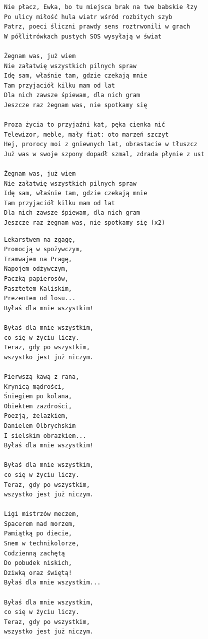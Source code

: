 \documentclass[12pt]{article}
\begin{document}
\begin{verbatim}
Nie płacz, Ewka, bo tu miejsca brak na twe babskie łzy
Po ulicy miłość hula wiatr wśród rozbitych szyb
Patrz, poeci śliczni prawdy sens roztrwonili w grach
W półlitrówkach pustych SOS wysyłają w świat

Żegnam was, już wiem
Nie załatwię wszystkich pilnych spraw
Idę sam, właśnie tam, gdzie czekają mnie
Tam przyjaciół kilku mam od lat
Dla nich zawsze śpiewam, dla nich gram
Jeszcze raz żegnam was, nie spotkamy się

Proza życia to przyjaźni kat, pęka cienka nić
Telewizor, meble, mały fiat: oto marzeń szczyt
Hej, prorocy moi z gniewnych lat, obrastacie w tłuszcz
Już was w swoje szpony dopadł szmal, zdrada płynie z ust

Żegnam was, już wiem
Nie załatwię wszystkich pilnych spraw
Idę sam, właśnie tam, gdzie czekają mnie
Tam przyjaciół kilku mam od lat
Dla nich zawsze śpiewam, dla nich gram
Jeszcze raz żegnam was, nie spotkamy się (x2)
\end{verbatim}
\clearpage

\begin{verbatim}
Lekarstwem na zgagę,
Promocją w spożywczym,
Tramwajem na Pragę,
Napojem odżywczym,
Paczką papierosów,
Pasztetem Kaliskim,
Prezentem od losu...
Byłaś dla mnie wszystkim!

Byłaś dla mnie wszystkim,
co się w życiu liczy.
Teraz, gdy po wszystkim,
wszystko jest już niczym.

Pierwszą kawą z rana,
Krynicą mądrości,
Śniegiem po kolana,
Obiektem zazdrości,
Poezją, żelazkiem,
Danielem Olbrychskim
I sielskim obrazkiem...
Byłaś dla mnie wszystkim!

Byłaś dla mnie wszystkim,
co się w życiu liczy.
Teraz, gdy po wszystkim,
wszystko jest już niczym.

Ligi mistrzów meczem,
Spacerem nad morzem,
Pamiątką po diecie,
Snem w technikolorze,
Codzienną zachętą
Do pobudek niskich,
Dziwką oraz świętą!
Byłaś dla mnie wszystkim...

Byłaś dla mnie wszystkim,
co się w życiu liczy.
Teraz, gdy po wszystkim,
wszystko jest już niczym.
\end{verbatim}
\clearpage
\end{document}
